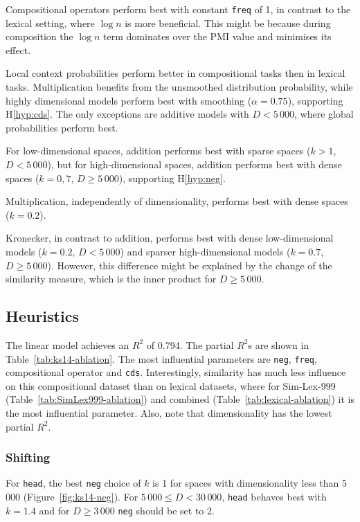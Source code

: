 Compositional operators perform best with constant \texttt{freq} of 1, in contrast to the lexical setting, where $\log n$ is more beneficial. This might be because during composition the $\log n$ term dominates over the PMI value and minimises its effect.

Local context probabilities perform better in compositional tasks then in lexical tasks. Multiplication benefits from the unsmoothed distribution probability, while highly dimensional models perform best with smoothing ($\alpha = 0.75$), supporting H\ref{hyp:cds}. The only exceptions are additive models with $D < 5\,000$, where global probabilities perform best.

For low-dimensional spaces, addition performs best with sparse spaces ($k > 1$, $D < 5\,000$), but for high-dimensional spaces, addition performs best  with dense spaces ($k = 0,7$, $D \geq 5\,000$), supporting H\ref{hyp:neg}.

Multiplication, independently of dimensionality, performs best with dense spaces ($k = 0.2$).

Kronecker, in contrast to addition, performs best with dense low-dimensional models ($k = 0.2$, $D < 5\,000$) and sparser high-dimensional models ($k = 0.7$, $D \geq 5\,000$). However, this difference might be explained by the change of the similarity measure, which is the inner product for $D \geq 5\,000$.

\subsection{Heuristics}
\label{sec:heuristics}



The linear model achieves an $R^2$ of 0.794. The partial $R^2$s are shown in Table~\ref{tab:ks14-ablation}. The most influential parameters are \texttt{neg}, \texttt{freq}, compositional operator and \texttt{cds}. Interestingly, similarity has much less influence on this compositional dataset than on lexical datasets, where for Sim-Lex-999 (Table~\ref{tab:SimLex999-ablation}) and combined (Table~\ref{tab:lexical-ablation}) it is the most influential parameter. Also, note that dimensionality has the lowest partial $R^2$.

\subsubsection{Shifting}


For \texttt{head}, the best \texttt{neg} choice of $k$ is 1 for spaces with dimensionality less than 5\,000 (Figure~\ref{fig:ks14-neg}). For $5\,000 \leq D < 30\,000$, \texttt{head} behaves best with $k = 1.4$ and for $D \geq 3\,000$ \texttt{neg} should be set to 2.

